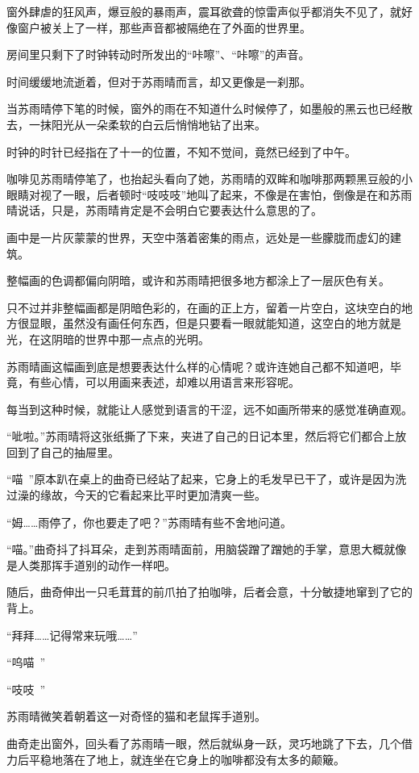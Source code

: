 窗外肆虐的狂风声，爆豆般的暴雨声，震耳欲聋的惊雷声似乎都消失不见了，就好像窗户被关上了一样，那些声音都被隔绝在了外面的世界里。

房间里只剩下了时钟转动时所发出的“咔嚓”、“咔嚓”的声音。

时间缓缓地流逝着，但对于苏雨晴而言，却又更像是一刹那。

当苏雨晴停下笔的时候，窗外的雨在不知道什么时候停了，如墨般的黑云也已经散去，一抹阳光从一朵柔软的白云后悄悄地钻了出来。

时钟的时针已经指在了十一的位置，不知不觉间，竟然已经到了中午。

咖啡见苏雨晴停笔了，也抬起头看向了她，苏雨晴的双眸和咖啡那两颗黑豆般的小眼睛对视了一眼，后者顿时“吱吱吱”地叫了起来，不像是在害怕，倒像是在和苏雨晴说话，只是，苏雨晴肯定是不会明白它要表达什么意思的了。

画中是一片灰蒙蒙的世界，天空中落着密集的雨点，远处是一些朦胧而虚幻的建筑。

整幅画的色调都偏向阴暗，或许和苏雨晴把很多地方都涂上了一层灰色有关。

只不过并非整幅画都是阴暗色彩的，在画的正上方，留着一片空白，这块空白的地方很显眼，虽然没有画任何东西，但是只要看一眼就能知道，这空白的地方就是光，在这阴暗的世界中那一点点的光明。

苏雨晴画这幅画到底是想要表达什么样的心情呢？或许连她自己都不知道吧，毕竟，有些心情，可以用画来表述，却难以用语言来形容呢。

每当到这种时候，就能让人感觉到语言的干涩，远不如画所带来的感觉准确直观。

“呲啦。”苏雨晴将这张纸撕了下来，夹进了自己的日记本里，然后将它们都合上放回到了自己的抽屉里。

“喵~”原本趴在桌上的曲奇已经站了起来，它身上的毛发早已干了，或许是因为洗过澡的缘故，今天的它看起来比平时更加清爽一些。

“姆……雨停了，你也要走了吧？”苏雨晴有些不舍地问道。

“喵。”曲奇抖了抖耳朵，走到苏雨晴面前，用脑袋蹭了蹭她的手掌，意思大概就像是人类那挥手道别的动作一样吧。

随后，曲奇伸出一只毛茸茸的前爪拍了拍咖啡，后者会意，十分敏捷地窜到了它的背上。

“拜拜……记得常来玩哦……”

“呜喵~”

“吱吱~”

苏雨晴微笑着朝着这一对奇怪的猫和老鼠挥手道别。

曲奇走出窗外，回头看了苏雨晴一眼，然后就纵身一跃，灵巧地跳了下去，几个借力后平稳地落在了地上，就连坐在它身上的咖啡都没有太多的颠簸。

